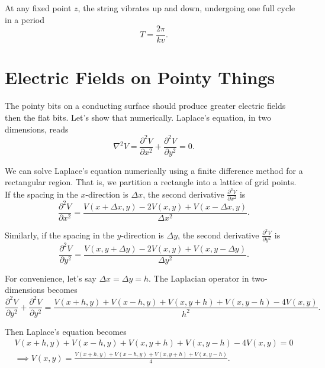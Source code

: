 \documentclass{article}
\numberwithin{equation}{section}
\begin{document}
At any fixed point $z$, the string vibrates up and down, undergoing one full cycle in a period
\begin{equation*}
    T = \frac{2\pi}{kv}.
\end{equation*}

\section{Electric Fields on Pointy Things}

The pointy bits on a conducting surface should produce greater electric fields then the flat bits. Let's show that numerically. Laplace's equation, in two dimensions, reads
\begin{equation}
    \nabla^2 V = \frac{\partial^2 V}{\partial x^2} + \frac{\partial^2 V}{\partial y^2} = 0.
\end{equation}

We can solve Laplace's equation numerically using a finite difference method for a rectangular region. That is, we partition a rectangle into a lattice of grid points. If the spacing in the $x$-direction is $\Delta x$, the second derivative $\frac{\partial^2 V}{\partial x^2}$ is
\begin{equation}
    \frac{\partial^2 V}{\partial x^2} = \frac{V(x + \Delta x, y) - 2V(x,y) + V(x - \Delta x, y)}{\Delta x^2}.
\end{equation}

Similarly, if the spacing in the $y$-direction is $\Delta y$, the second derivative $\frac{\partial^2 V}{\partial y^2}$ is
\begin{equation}
    \frac{\partial^2 V}{\partial y^2} = \frac{V(x, y + \Delta y) - 2V(x,y) + V(x, y - \Delta y)}{\Delta y^2}.
\end{equation}

For convenience, let's say $\Delta x = \Delta y = h$. The Laplacian operator in two-dimensions becomes
\begin{equation}
    \frac{\partial^2 V}{\partial y^2} + \frac{\partial^2 V}{\partial y^2} = \frac{V(x + h, y) + V(x - h, y) + V(x, y + h) + V(x, y - h) - 4V(x,y)}{h^2}.
\end{equation}

Then Laplace's equation becomes
\begin{gather}
    V(x + h, y) + V(x - h, y) + V(x, y + h) + V(x, y - h) - 4V(x,y) = 0 \\
    \implies \boxed{V(x,y) = \frac{V(x + h, y) + V(x - h, y) + V(x, y + h) + V(x, y - h)}{4}}.
\end{gather}
\end{document}
